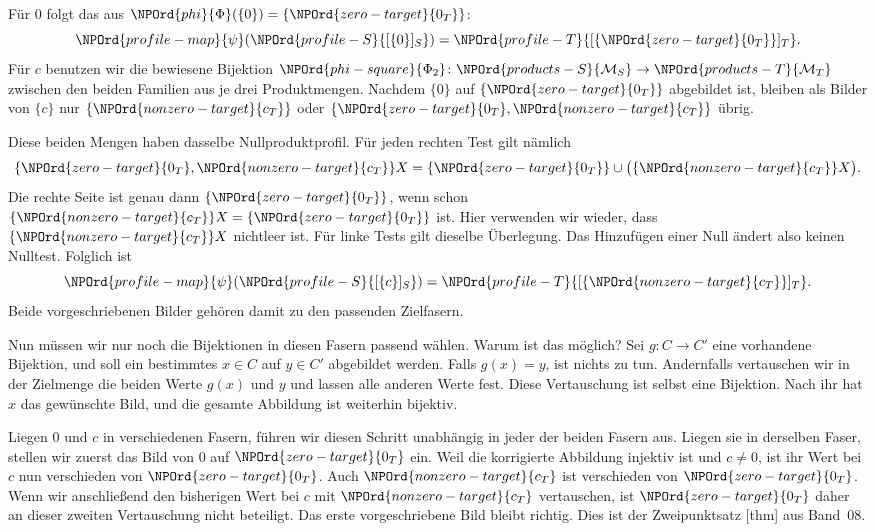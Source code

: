 Für \(0\) folgt das aus \(\NPOrd{phi}{\Phi}(\{0\})=\{\NPOrd{zero-target}{0_T}\}\):
\[
 \NPOrd{profile-map}{\psi}(\NPOrd{profile-S}{[\{0\}]_S})=\NPOrd{profile-T}{[\{\NPOrd{zero-target}{0_T}\}]_T}.
\]
Für \(c\) benutzen wir die bewiesene Bijektion
\(\NPOrd{phi-square}{\Phi_2}\colon\NPOrd{products-S}{\mathcal M_S}\to\NPOrd{products-T}{\mathcal M_T}\) zwischen den beiden
Familien aus je drei Produktmengen. Nachdem \(\{0\}\) auf \(\{\NPOrd{zero-target}{0_T}\}\)
abgebildet ist, bleiben als Bilder von \(\{c\}\) nur
\(\{\NPOrd{nonzero-target}{c_T}\}\) oder \(\{\NPOrd{zero-target}{0_T},\NPOrd{nonzero-target}{c_T}\}\) übrig.

Diese beiden Mengen haben dasselbe Nullproduktprofil.
Für jeden rechten Test gilt nämlich
\[
 \{\NPOrd{zero-target}{0_T},\NPOrd{nonzero-target}{c_T}\}X=\{\NPOrd{zero-target}{0_T}\}\cup\bigl(\{\NPOrd{nonzero-target}{c_T}\}X\bigr).
\]
Die rechte Seite ist genau dann \(\{\NPOrd{zero-target}{0_T}\}\), wenn schon
\(\{\NPOrd{nonzero-target}{c_T}\}X=\{\NPOrd{zero-target}{0_T}\}\) ist. Hier verwenden wir wieder, dass
\(\{\NPOrd{nonzero-target}{c_T}\}X\) nichtleer ist. Für linke Tests gilt dieselbe Überlegung.
Das Hinzufügen einer Null ändert also keinen Nulltest. Folglich ist
\[
 \NPOrd{profile-map}{\psi}(\NPOrd{profile-S}{[\{c\}]_S})=\NPOrd{profile-T}{[\{\NPOrd{nonzero-target}{c_T}\}]_T}.
\]
Beide vorgeschriebenen Bilder gehören damit zu den passenden Zielfasern.

\par{}
Nun müssen wir nur noch die Bijektionen in diesen Fasern passend wählen.
Warum ist das möglich? Sei \(g\colon C\to C'\) eine vorhandene Bijektion,
und soll ein bestimmtes \(x\in C\) auf \(y\in C'\) abgebildet werden.
Falls \(g(x)=y\), ist nichts zu tun. Andernfalls vertauschen wir in
der Zielmenge die beiden Werte \(g(x)\) und \(y\) und lassen alle
anderen Werte fest. Diese Vertauschung ist selbst eine Bijektion.
Nach ihr hat \(x\) das gewünschte Bild, und die gesamte Abbildung
ist weiterhin bijektiv.

Liegen \(0\) und \(c\) in verschiedenen Fasern, führen wir diesen
Schritt unabhängig in jeder der beiden Fasern aus.
Liegen sie in derselben Faser, stellen wir zuerst das Bild von \(0\)
auf \(\NPOrd{zero-target}{0_T}\) ein. Weil die korrigierte Abbildung injektiv ist und
\(c\ne0\), ist ihr Wert bei \(c\) nun verschieden von \(\NPOrd{zero-target}{0_T}\).
Auch \(\NPOrd{nonzero-target}{c_T}\) ist verschieden von \(\NPOrd{zero-target}{0_T}\).
Wenn wir anschließend den bisherigen Wert bei \(c\) mit \(\NPOrd{nonzero-target}{c_T}\)
vertauschen, ist \(\NPOrd{zero-target}{0_T}\) daher an dieser zweiten Vertauschung nicht
beteiligt. Das erste vorgeschriebene Bild bleibt richtig.
Dies ist der Zweipunktsatz
[thm] aus Band~08.

